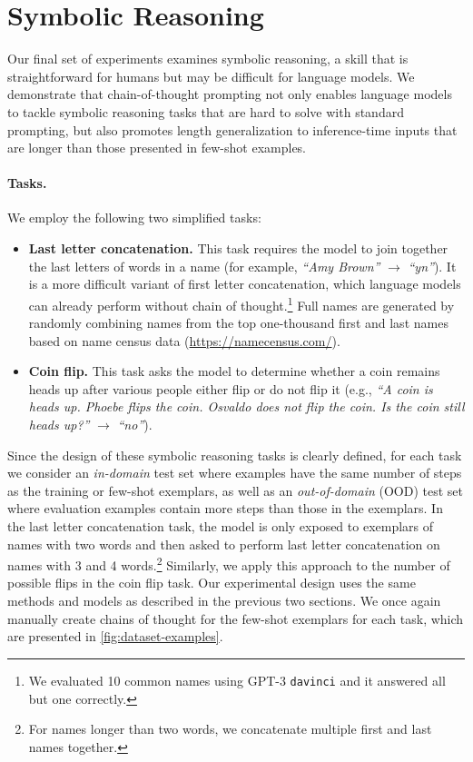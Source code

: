 

  
\section{Symbolic Reasoning}\label{sec:symbolic-reasoning}  
Our final set of experiments examines symbolic reasoning, a skill that is straightforward for humans but may be difficult for language models. We demonstrate that chain-of-thought prompting not only enables language models to tackle symbolic reasoning tasks that are hard to solve with standard prompting, but also promotes length generalization to inference-time inputs that are longer than those presented in few-shot examples.

\paragraph{Tasks.}  
We employ the following two simplified tasks:

\begin{itemize}[leftmargin=*,topsep=0pt]
    \itemsep0em \item \textbf{Last letter concatenation.} This task requires the model to join together the last letters of words in a name (for example, \textit{``Amy Brown''} $\rightarrow$ \textit{``yn''}).  
    It is a more difficult variant of first letter concatenation, which language models can already perform without chain of thought.\footnote{We evaluated 10 common names using GPT-3 \texttt{davinci} and it answered all but one correctly.} Full names are generated by randomly combining names from the top one-thousand first and last names based on name census data ({\small{\url{https://namecensus.com/}}}).  
    \item \textbf{Coin flip.} This task asks the model to determine whether a coin remains heads up after various people either flip or do not flip it (e.g., \textit{``A coin is heads up. Phoebe flips the coin. Osvaldo does not flip the coin. Is the coin still heads up?''} $\rightarrow$ \textit{``no''}).
\end{itemize}

Since the design of these symbolic reasoning tasks is clearly defined, for each task we consider an \textit{in-domain} test set where examples have the same number of steps as the training or few-shot exemplars, as well as an \textit{out-of-domain} (OOD) test set where evaluation examples contain more steps than those in the exemplars. In the last letter concatenation task, the model is only exposed to exemplars of names with two words and then asked to perform last letter concatenation on names with 3 and 4 words.\footnote{For names longer than two words, we concatenate multiple first and last names together.} Similarly, we apply this approach to the number of possible flips in the coin flip task. Our experimental design uses the same methods and models as described in the previous two sections. We once again manually create chains of thought for the few-shot exemplars for each task, which are presented in \cref{fig:dataset-examples}.

